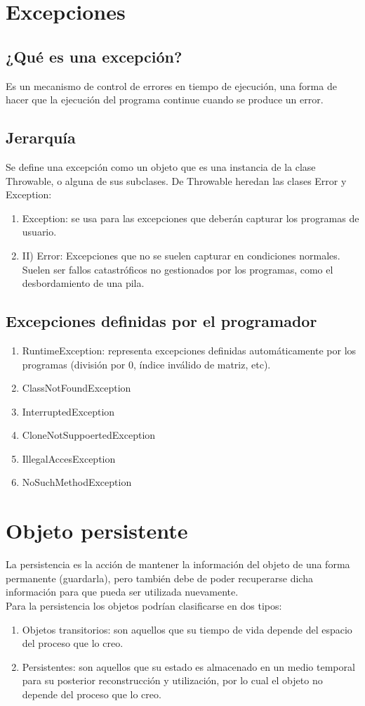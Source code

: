 \documentclass{book} %
\begin{document}
\chapter{Excepciones}
\section{¿Qué es una excepción?}
Es un mecanismo de control de errores en tiempo de ejecución, una forma de hacer que la ejecución del programa continue cuando se produce un error.
\section{Jerarquía}
Se define una excepción como un objeto que es una instancia de la clase Throwable, o alguna de sus subclases. De Throwable heredan las clases Error y Exception:
\begin{enumerate}
	\item Exception: se usa para las excepciones que deberán capturar los programas de usuario.  
	\item II) Error: Excepciones que no se suelen capturar en condiciones normales. Suelen ser fallos catastróficos no gestionados por los programas, como el desbordamiento de una pila. 
\end{enumerate}
\section{Excepciones definidas por el programador}
\begin{enumerate}
	\item RuntimeException: representa excepciones definidas automáticamente por los programas (división por 0, índice inválido de matriz, etc).
	\item ClassNotFoundException
	\item InterruptedException
	\item CloneNotSuppoertedException
	\item IllegalAccesException
	\item NoSuchMethodException
\end{enumerate}
\chapter{Objeto persistente}
La persistencia es la acción de mantener la información del objeto de una forma permanente (guardarla), pero también debe de poder recuperarse dicha información para que pueda ser utilizada nuevamente. \\
Para la persistencia los objetos podrían clasificarse en dos tipos:
\begin{enumerate}
	\item Objetos transitorios: son aquellos que su tiempo de vida depende del espacio del proceso que lo creo.
	\item Persistentes: son aquellos que su estado es almacenado en un medio temporal para su posterior reconstrucción y utilización, por lo cual el objeto no depende del proceso que lo creo. 
\end{enumerate}
\end{document}
